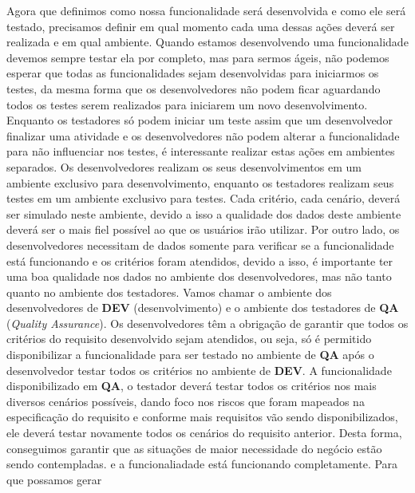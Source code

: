       Agora que definimos como nossa funcionalidade será desenvolvida e como ele será
      testado, precisamos definir em qual momento cada uma dessas ações deverá ser
      realizada e em qual ambiente. Quando estamos desenvolvendo uma funcionalidade
      devemos sempre testar ela por completo, mas para sermos ágeis, não podemos
      esperar que todas as funcionalidades sejam desenvolvidas para iniciarmos os testes,
      da mesma forma que os desenvolvedores não podem ficar aguardando todos os
      testes serem realizados para iniciarem um novo desenvolvimento. Enquanto os
      testadores só podem iniciar um teste assim que um desenvolvedor finalizar
      uma atividade e os desenvolvedores não podem alterar a funcionalidade para não
      influenciar nos testes, é interessante realizar estas ações em ambientes
      separados. Os desenvolvedores realizam os seus desenvolvimentos em um ambiente
      exclusivo para desenvolvimento, enquanto os testadores realizam seus testes
      em um ambiente exclusivo para testes. Cada critério, cada cenário, deverá ser
      simulado neste ambiente, devido a isso a qualidade dos dados deste ambiente
      deverá ser o mais fiel possível ao que os usuários irão utilizar. Por outro
      lado, os desenvolvedores necessitam de dados somente para verificar se a
      funcionalidade está funcionando e os critérios foram atendidos, devido a isso,
      é importante ter uma boa qualidade nos dados no ambiente dos desenvolvedores,
      mas não tanto quanto no ambiente dos testadores. Vamos chamar o ambiente dos
      desenvolvedores de \textbf{DEV} (desenvolvimento) e o ambiente dos testadores
      de \textbf{QA} (\textit{Quality Assurance}). \newline
      Os desenvolvedores têm a obrigação de garantir que todos os critérios do
      requisito desenvolvido sejam atendidos, ou seja, só é permitido disponibilizar
      a funcionalidade para ser testado no ambiente de \textbf{QA} após o desenvolvedor
      testar todos os critérios no ambiente de \textbf{DEV}. A funcionalidade disponibilizado
      em \textbf{QA}, o testador deverá testar todos os critérios nos mais diversos
      cenários possíveis, dando foco nos riscos que foram mapeados na especificação
      do requisito e conforme mais requisitos vão sendo disponibilizados, ele deverá
      testar novamente todos os cenários do requisito anterior. Desta forma, conseguimos
      garantir que as situações de maior necessidade do negócio estão sendo contempladas.
      e a funcionaliadade está funcionando completamente. Para que possamos gerar
